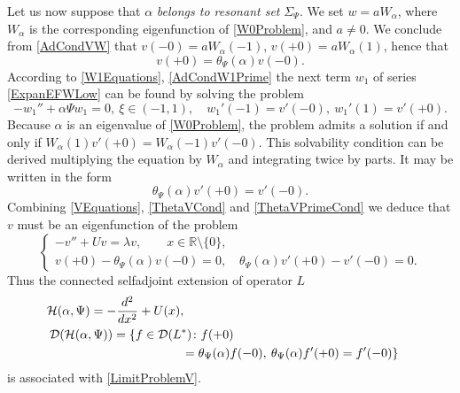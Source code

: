 \documentclass[11pt,english]{amsart}
\begin{document}
Let us now suppose that $\alpha$ \emph{belongs to  resonant set} $\Sigma_\Psi$. We set $w=aW_\alpha$, where $W_\alpha$ is the corresponding eigenfunction of \eqref{W0Problem}, and $a\neq 0$.
We conclude from \eqref{AdCondVW} that  $v(-0)=aW_\alpha(-1)$, $v(+0)=aW_\alpha(1)$, hence that
\begin{equation}\label{ThetaVCond}
    v(+0)=\theta_\Psi (\alpha)v(-0).
\end{equation}
According to \eqref{W1Equations}, \eqref{AdCondW1Prime}  the next term $w_1$ of series \eqref{ExpanEFWLow} can be found by solving the problem
\begin{equation}
\label{W1Problem}
-w_1''+\alpha\Psi w_1=0,\:\xi\in(-1,1),\quad
w_1'(-1)=v'(-0),\: w_1'(1)=v'(+0).
\end{equation}
Because $\alpha$ is an eigenvalue of \eqref{W0Problem}, the problem admits a solution if and only if $W_\alpha(1)v'(+0)=W_\alpha(-1)v'(-0)$.
This solvability condition can be derived multiplying the equation by $W_\alpha$ and integrating
twice by parts.
It may be written in the form
\begin{equation}\label{ThetaVPrimeCond}
    \theta_\Psi (\alpha)v'(+0)=v'(-0).
\end{equation}
Combining  \eqref{VEquations}, \eqref{ThetaVCond} and \eqref{ThetaVPrimeCond} we deduce that $v$ must be an eigenfunction of the  problem
\begin{equation}\label{LimitProblemV}
\begin{cases}
    -v''+U v=\lambda v,\qquad x\in\mathbb{R}\setminus\{0\},\\
    v(+0)-\theta_\Psi (\alpha)v(-0)=0,\quad \theta_\Psi (\alpha) v'(+0)-v'(-0)=0.
\end{cases}
  \end{equation}
Thus the connected selfadjoint extension of operator $L$
\begin{equation}\label{LimitOperatorResonance}
\begin{gathered}
\hskip-6.5cm    \mathcal{H}(\alpha,\Psi)=-\frac{d^2}{dx^2}+U(x),\\
\mathcal{D}(\mathcal{H}(\alpha,\Psi)) =\{f\in \mathcal{D}(L^*)\colon
f(+0)\hskip5cm\\\hskip3.5cm=\theta_\Psi (\alpha)f(-0),\: \theta_\Psi (\alpha)f'(+0)=f'(-0)
\}
\end{gathered}
\end{equation}
is associated with \eqref{LimitProblemV}.
\end{document}
